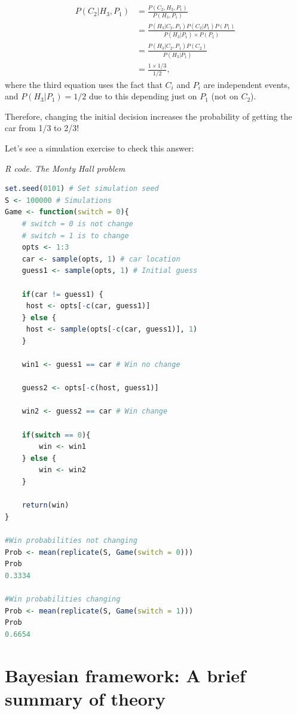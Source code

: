 \begin{align*}
	P(C_2|H_3,P_1)&= \frac{P(C_2,H_3,P_1)}{P(H_3,P_1)}\\
	&= \frac{P(H_3|C_2,P_1)P(C_2|P_1)P(P_1)}{P(H_3|P_1)\times P(P_1)}\\
	&= \frac{P(H_3|C_2,P_1)P(C_2)}{P(H_3|P_1)}\\
	&=\frac{1\times 1/3}{1/2},
\end{align*}
where the third equation uses the fact that $C_i$ and $P_i$ are independent events, and $P(H_3|P_1)=1/2$ due to this depending just on $P_1$ (not on $C_2$).

Therefore, changing the initial decision increases the probability of getting the car from 1/3 to 2/3!

Let's see a simulation exercise to check this answer:

\begin{tcolorbox}[enhanced,width=4.67in,center upper,
	fontupper=\large\bfseries,drop shadow southwest,sharp corners]
\textit{R code. The Monty Hall problem}
\begin{VF}
\begin{lstlisting}[basicstyle=\footnotesize, language=R]
set.seed(0101) # Set simulation seed
S <- 100000 # Simulations
Game <- function(switch = 0){
	# switch = 0 is not change  
	# switch = 1 is to change
	opts <- 1:3 
	car <- sample(opts, 1) # car location
	guess1 <- sample(opts, 1) # Initial guess 
	
	if(car != guess1) {
	 host <- opts[-c(car, guess1)]
	} else {
	 host <- sample(opts[-c(car, guess1)], 1)
	}
	
	win1 <- guess1 == car # Win no change
	
	guess2 <- opts[-c(host, guess1)]
	
	win2 <- guess2 == car # Win change
	
	if(switch == 0){
		win <- win1
	} else {
		win <- win2
	}
	
	return(win)
}

#Win probabilities not changing
Prob <- mean(replicate(S, Game(switch = 0))) 
Prob
0.3334

#Win probabilities changing
Prob <- mean(replicate(S, Game(switch = 1))) 
Prob
0.6654
\end{lstlisting}
\end{VF}
\end{tcolorbox}

\section{Bayesian framework: A brief summary of theory}\label{sec12}

